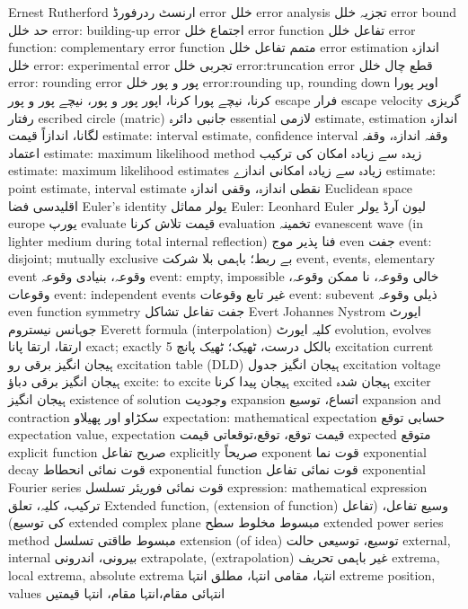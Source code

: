 Ernest Rutherford	ارنسٹ ردرفورڈ
error	خلل
error analysis	تجزیہ خلل
error bound	حد خلل
error: building-up error	اجتماع خلل
error function	تفاعل خلل
error function: complementary error function	متمم تفاعل خلل
error estimation	اندازہ خلل
error: experimental error	تجربی خلل
error:truncation error	قطع چال خلل
error: rounding error	پور و پور خلل
error:rounding up, rounding down	اوپر پورا کرنا، نیچے پورا کرنا، اپور پور و پور، نیچے پور و پور
escape	فرار
escape velocity	گریزی رفتار
escribed circle (matric)	جانبی دائرہ
essential	لازمی
estimate, estimation	اندازہ لگانا، اندازاً قیمت
estimate: interval estimate, confidence interval	وقفہ اندازہ، وقفہ اعتماد
estimate: maximum likelihood method	زیدہ سے زیادہ امکان کی ترکیب
estimate: maximum likelihood estimates	زیادہ سے زیادہ امکانی  اندازے
estimate: point estimate, interval estimate	نقطی اندازہ، وقفی اندازہ
Euclidean space	اقلیدسی فضا
Euler's identity	یولر مماثل
Euler: Leonhard Euler	لیون آرڈ یولر
europe	یورپ
evaluate	قیمت تلاش کرنا
evaluation	تخمینہ
evanescent wave (in  lighter medium during total internal reflection)	فنا پذیر موج
even	جفت
event: disjoint; mutually exclusive	بے ربط؛ باہمی بلا شرکت
event, events, elementary event	وقوعہ، بنیادی وقوعہ
event: empty, impossible	خالی وقوعہ، نا ممکن وقوعہ، وقوعات
event: independent events	غیر تابع وقوعات
event: subevent	ذیلی وقوعہ
even function symmetry	جفت تفاعل تشاکل
Evert Johannes Nystrom	ایورٹ جوہانس نیستروم
Everett formula (interpolation)	کلیہ ایورٹ
evolution, evolves	ارتقا، ارتقا پانا
exact; exactly 5	بالکل درست، ٹھیک؛ ٹھیک پانچ
excitation current	ہیجان انگیز برقی رو
excitation table (DLD)	ہیجان انگیز جدول
excitation voltage	 ہیجان انگیز برقی دباؤ
excite: to excite	ہیجان پیدا کرنا
excited	ہیجان شدہ
exciter	ہیجان انگیز
existence of solution	وجودیت
expansion	اتساع، توسیع
expansion and contraction	سکڑاو اور پھیلاو
expectation: mathematical expectation	حسابی  توقع
expectation value, expectation	قیمت توقع، توقع،توقعاتی قیمت
expected	متوقع
explicit function	صریح تفاعل
explicitly	صریحاً
exponent	قوت نما
exponential decay	قوت نمائی انحطاط
exponential function	قوت نمائی تفاعل
exponential Fourier series	قوت نمائی فوریئر تسلسل
expression: mathematical expression	ترکیب، کلیہ، تعلق
Extended function, (extension of function)	وسیع تفاعل، (تفاعل کی توسیع)
extended complex plane	مبسوط مخلوط سطح
extended power series method	مبسوط طاقتی تسلسل
extension (of idea)	توسیع، توسیعی حالت
external, internal	بیرونی، اندرونی
extrapolate, (extrapolation)	غیر باہمی تحریف
extrema, local extrema, absolute extrema	انتہا، مقامی انتہا، مطلق انتہا
extreme position, values	انتہائی مقام،انتہا مقام، انتہا قیمتیں
